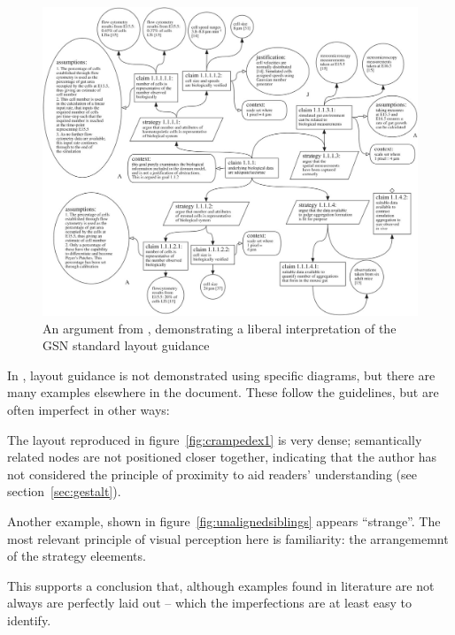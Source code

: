\begin{figure}
    \includegraphics[width=\textwidth]{graphics/aldencentral.jpg}
    \caption{An argument from \cite{royal}, demonstrating a liberal interpretation of the GSN standard layout guidance}
    \label{fig:aldencentral}
\end{figure}

In \cite{gsnstandard}, layout guidance is not demonstrated using specific diagrams, but there are many examples elsewhere in the document. These follow the guidelines, but are often imperfect in other ways:

\begin{itemize*}
    \item The layout reproduced in figure~\ref{fig:crampedex1} is very dense; semantically related nodes are not positioned closer together, indicating that the author has not considered the principle of proximity to aid readers' understanding (see section~\ref{sec:gestalt}).
    \item Another example, shown in figure~\ref{fig:unalignedsiblings} appears ``strange''. The most relevant principle of visual perception here is familiarity: the arrangememnt of the strategy eleements.
\end{itemize*}

This supports a conclusion that, although examples found in literature are not always are perfectly laid out -- which  the imperfections are at least easy to identify.

